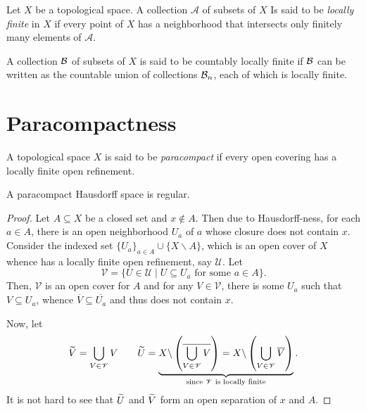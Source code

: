 \begin{definition}
    Let $X$ be a topological space. A collection $\mathscr A$ of subsets of $X$ Is said to be \emph{locally finite} in $X$ if every point of $X$ has a neighborhood that intersects only finitely many elements of $\mathscr A$.
\end{definition}

\begin{definition}
    A collection $\mathcal{B}$ of subsets of $X$ is said to be countably locally finite if $\mathcal{B}$ can be written as the countable union of collections $\mathcal{B}_n$, each of which is locally finite.
\end{definition}

\section{Paracompactness}

\begin{definition}[Paracompact]
    A topological space $X$ is said to be \emph{paracompact} if every open covering has a locally finite open refinement.
\end{definition}

\begin{proposition}
    A paracompact Hausdorff space is regular.
\end{proposition}
\begin{proof}
    Let $A\subseteq X$ be a closed set and $x\notin A$. Then due to Hausdorff-ness, for each $a\in A$, there is an open neighborhood $U_a$ of $a$ whose closure does not contain $x$. Consider the indexed set $\{U_a\}_{a\in A}\cup\{X\backslash A\}$, which is an open cover of $X$ whence has a locally finite open refinement, say $\mathscr U$. Let 
    \begin{equation*}
        \mathscr V = \{U\in\mathscr U\mid U\subseteq U_a\text{ for some } a\in A\}.
    \end{equation*}
    Then, $\mathscr V$ is an open cover for $A$ and for any $V\in\mathscr V$, there is some $U_a$ such that $V\subseteq U_a$, whence $\overline V\subseteq\overline{U_a}$ and thus does not contain $x$. 

    Now, let 
    \begin{equation*}
        \widetilde{V} = \bigcup_{V\in\mathscr V}V\qquad\widetilde{U} = \underbrace{X\backslash\left(\overline{\bigcup_{V\in\mathscr V}V}\right) = X\backslash\left(\bigcup_{V\in\mathscr V}\overline V\right)}_{\text{since } \mathscr{V}\text{ is locally finite}}.
    \end{equation*}
    It is not hard to see that $\widetilde{U}$ and $\widetilde{V}$ form an open separation of $x$ and $A$.
\end{proof}

